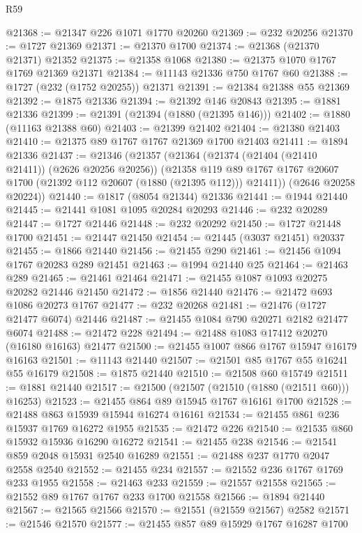 \begin{lexlean}{R59}
\begin{coremodule}
@21368 := @21347 @226 @1071 @1770 @20260
@21369 := @232 @20256
@21370 := @1727 @21369
@21371 := @21370 @1700
@21374 := @21368 (@21370 @21371) @21352
@21375 := @21358 @1068
@21380 := @21375 @1070 @1767 @1769 @21369 @21371
@21384 := @11143 @21336 @750 @1767 @60
@21388 := @1727 (@232 (@1752 @20255)) @21371
@21391 := @21384 @21388 @55 @21369
@21392 := @1875 @21336
@21394 := @21392 @146 @20843
@21395 := @1881 @21336
@21399 := @21391 (@21394 (@1880 (@21395 @146)))
@21402 := @1880 (@11163 @21388 @60)
@21403 := @21399 @21402
@21404 := @21380 @21403
@21410 := @21375 @89 @1767 @1767 @21369 @1700 @21403
@21411 := @1894 @21336
@21437 := @21346
    (@21357
      (@21364
        (@21374 (@21404 (@21410 @21411)) (@2626 @20256 @20256))
        (@21358
          @119
          @89
          @1767
          @1767
          @20607
          @1700
          (@21392 @112 @20607 (@1880 (@21395 @112)))
          @21411))
      (@2646 @20258 @20224))
@21440 := @1817 (@8054 @21344) @21336
@21441 := @1944 @21440
@21445 := @21441 @1081 @1095 @20284 @20293
@21446 := @232 @20289
@21447 := @1727 @21446
@21448 := @232 @20292
@21450 := @1727 @21448 @1700
@21451 := @21447 @21450
@21454 := @21445 (@3037 @21451) @20337
@21455 := @1866 @21440
@21456 := @21455 @290
@21461 := @21456 @1094 @1767 @20283 @289 @21451
@21463 := @1994 @21440 @25
@21464 := @21463 @289
@21465 := @21461 @21464
@21471 := @21455 @1087 @1093 @20275 @20282 @21446 @21450
@21472 := @1856 @21440
@21476 := @21472 @693 @1086 @20273 @1767
@21477 := @232 @20268
@21481 := @21476 (@1727 @21477 @6074) @21446
@21487 := @21455 @1084 @790 @20271 @2182 @21477 @6074
@21488 := @21472 @228
@21494 := @21488 @1083 @17412 @20270 (@16180 @16163) @21477
@21500 := @21455 @1007 @866 @1767 @15947 @16179 @16163
@21501 := @11143 @21440
@21507 := @21501 @85 @1767 @55 @16241 @55 @16179
@21508 := @1875 @21440
@21510 := @21508 @60 @15749
@21511 := @1881 @21440
@21517 := @21500 (@21507 (@21510 (@1880 (@21511 @60))) @16253)
@21523 := @21455 @864 @89 @15945 @1767 @16161 @1700
@21528 := @21488 @863 @15939 @15944 @16274 @16161
@21534 := @21455 @861 @236 @15937 @1769 @16272 @1955
@21535 := @21472 @226
@21540 := @21535 @860 @15932 @15936 @16290 @16272
@21541 := @21455 @238
@21546 := @21541 @859 @2048 @15931 @2540 @16289
@21551 := @21488 @237 @1770 @2047 @2558 @2540
@21552 := @21455 @234
@21557 := @21552 @236 @1767 @1769 @233 @1955
@21558 := @21463 @233
@21559 := @21557 @21558
@21565 := @21552 @89 @1767 @1767 @233 @1700 @21558
@21566 := @1894 @21440
@21567 := @21565 @21566
@21570 := @21551 (@21559 @21567) @2582
@21571 := @21546 @21570
@21577 := @21455 @857 @89 @15929 @1767 @16287 @1700

\end{coremodule}
\end{lexlean}
